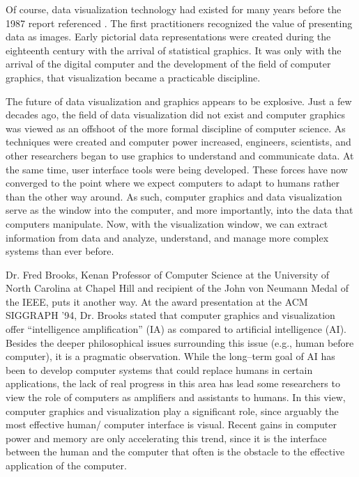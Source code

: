 Of course, data visualization technology had existed for many years before the 1987 report referenced \cite{Tufte83}. The first practitioners recognized the value of presenting data as images. Early pictorial data representations were created during the eighteenth century with the arrival of statistical graphics. It was only with the arrival of the digital computer and the development of the field of computer graphics, that visualization became a practicable discipline.

The future of data visualization and graphics appears to be explosive. Just a few decades ago, the field of data visualization did not exist and computer graphics was viewed as an offshoot of the more formal discipline of computer science. As techniques were created and computer power increased, engineers, scientists, and other researchers began to use graphics to understand and communicate data. At the same time, user interface tools were being developed. These forces have now converged to the point where we expect computers to adapt to humans rather than the other way around. As such, computer graphics and data visualization serve as the window into the computer, and more importantly, into the data that computers manipulate. Now, with the visualization window, we can extract information from data and analyze, understand, and manage more complex systems than ever before.

Dr. Fred Brooks, Kenan Professor of Computer Science at the University of North Carolina at Chapel Hill and recipient of the John von Neumann Medal of the IEEE, puts it another way. At the award presentation at the ACM SIGGRAPH '94, Dr. Brooks stated that computer graphics and visualization offer ``intelligence amplification'' (IA) as compared to artificial intelligence (AI). Besides the deeper philosophical issues surrounding this issue (e.g., human before computer), it is a pragmatic observation. While the long--term goal of AI has been to develop computer systems that could replace humans in certain applications, the lack of real progress in this area has lead some researchers to view the role of computers as amplifiers and assistants to humans. In this view, computer graphics and visualization play a significant role, since arguably the most effective human/ computer interface is visual. Recent gains in computer power and memory are only accelerating this trend, since it is the interface between the human and the computer that often is the obstacle to the effective application of the computer.


